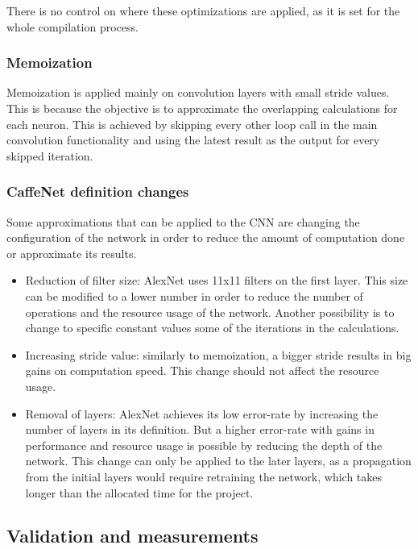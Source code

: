 \begin{enumerate}
There is no control on where these optimizations are applied, as it is set for the whole
compilation process.

\subsubsection{Memoization}

Memoization is applied mainly on convolution layers with small stride values. This is because
the objective is to approximate the overlapping calculations for each neuron. This is achieved
by skipping every other loop call in the main convolution functionality and using the latest
result as the output for every skipped iteration.

\subsubsection{CaffeNet definition changes}

Some approximations that can be applied to the CNN are changing the configuration of the network
in order to reduce the amount of computation done or approximate its results.

\begin{itemize}
    \item Reduction of filter size: AlexNet uses 11{x}11 filters on the first layer. This size
    can be modified to a lower number in order to reduce the number of operations and the
    resource usage of the network. Another
    possibility is to change to specific constant values some of the iterations in the calculations.
    \item Increasing stride value: similarly to memoization, a bigger stride results in big gains
    on computation speed. This change should not affect the resource usage.
    \item Removal of layers: AlexNet achieves its low error-rate by increasing the number of layers
    in its definition. But a higher error-rate with gains in performance and resource usage is
    possible by reducing the depth of the network. This change can only be applied to the later
    layers, as a propagation from the initial layers would require retraining the network, which
    takes longer than the allocated time for the project.
\end{itemize}

\subsection{Validation and measurements}


\end{enumerate}

